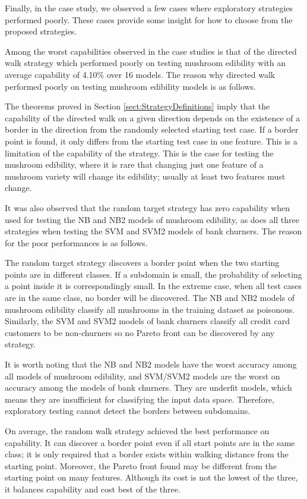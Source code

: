 \documentclass[preprint,1p,authoryear,times]{elsarticle}
\begin{document}
Finally, in the case study, we observed a few cases where exploratory strategies performed poorly. These cases provide some insight for how to choose from the proposed strategies. 

Among the worst capabilities observed in the case studies is that of the directed walk strategy which performed poorly on testing mushroom edibility with an average capability of 4.10\% over 16 models. The reason why directed walk performed poorly on testing mushroom edibility models is as follows. 

The theorems proved in Section \ref{sect:StrategyDefinitions} imply that the capability of the directed walk on a given direction depends on the existence of a border in the direction from the randomly selected starting test case. If a border point is found, it only differs from the starting test case in one feature. This is a limitation of the capability of the strategy. This is the case for testing the mushroom edibility, where it is rare that changing just one feature of a mushroom variety will change its edibility; usually at least two features must change.

It was also observed that the random target strategy has zero capability when used for testing the NB and NB2 models of mushroom edibility, as does all three strategies when testing the SVM and SVM2 models of bank churners. The reason for the poor performances is as follows. 

The random target strategy discovers a border point when the two starting points are in different classes. If a subdomain is small, the probability of selecting a point inside it is correspondingly small. In the extreme case, when all test cases are in the same class, no border will be discovered. The NB and NB2 models of mushroom edibility classify all mushrooms in the training dataset as poisonous. Similarly, the SVM and SVM2 models of bank churners classify all credit card customers to be non-churners so no Pareto front can be discovered by any strategy. 

It is worth noting that the NB and NB2 models have the worst accuracy among all models of mushroom edibility, and SVM/SVM2 models are the worst on accuracy among the models of bank churners. They are underfit models, which means they are insufficient for classifying the input data space. Therefore, exploratory testing cannot detect the borders between subdomains. 

On average, the random walk strategy achieved the best performance on capability. It can discover a border point even if all start points are in the same class; it is only required that a border exists within walking distance from the starting point. Moreover, the Pareto front found may be different from the starting point on many features. Although its cost is not the lowest of the three, it balances capability and cost best of the three.
\end{document}
